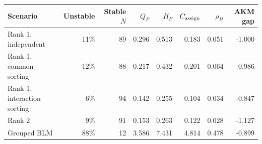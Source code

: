 \begin{tabular}{lrrrrrrr}
\toprule
Scenario & Unstable & Stable $N$ & $Q_F$ & $H_F$ & $C_{\rm assign}$ & $\rho_H$ & AKM gap \\
\midrule
Rank 1, independent & 11\% & 89 & 0.296 & 0.513 & 0.183 & 0.051 & -1.000 \\
Rank 1, common sorting & 12\% & 88 & 0.217 & 0.432 & 0.201 & 0.064 & -0.986 \\
Rank 1, interaction sorting & 6\% & 94 & 0.142 & 0.255 & 0.104 & 0.034 & -0.847 \\
Rank 2 & 9\% & 91 & 0.153 & 0.263 & 0.122 & 0.028 & -1.127 \\
Grouped BLM & 88\% & 12 & 3.586 & 7.431 & 4.814 & 0.478 & -0.899 \\
\bottomrule
\end{tabular}


